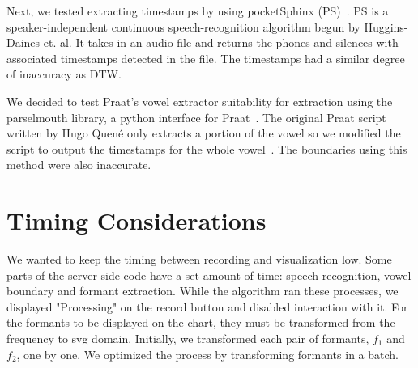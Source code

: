 Next, we tested extracting timestamps by using pocketSphinx (PS)~\cite{huggins2006pocketsphinx}. PS is a speaker-independent continuous speech-recognition algorithm begun by Huggins-Daines et. al. It takes in an audio file and returns the phones and silences with associated timestamps detected in the file. The timestamps had a similar degree of inaccuracy as DTW.

We decided to test Praat's vowel extractor suitability for extraction using the parselmouth library, a python interface for Praat~\cite{jadoul2018introducing}. The original Praat script written by Hugo Quené only extracts a portion of the vowel so we modified the script to output the timestamps for the whole vowel~\cite{hugoQuenePraat}. The boundaries using this method were also inaccurate. 

\section{Timing Considerations}
We wanted to keep the timing between recording and visualization low. Some parts of the server side code have a set amount of time: speech recognition, vowel boundary and formant extraction. While the algorithm ran these processes, we displayed "Processing" on the record button and disabled interaction with it. For the formants to be displayed on the chart, they must be transformed from the frequency to svg domain. Initially, we transformed each pair of formants, $f_1$ and $f_2$, one by one. We optimized the process by transforming formants in a batch. 